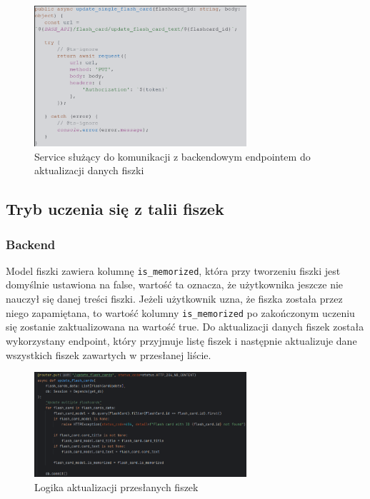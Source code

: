 \begin{figure}[H]
    \centering
    \includegraphics[width=0.7\textwidth]{chapters/chapter_8/screens/update_flash_card_text_web}
    \caption{Service służący do komunikacji z backendowym endpointem do aktualizacji danych fiszki}
    \label{img:update_flash_card_web}
\end{figure}

\subsection{Tryb uczenia się z talii fiszek}

\subsubsection{Backend}

Model fiszki zawiera kolumnę \texttt{is_memorized}, która przy tworzeniu fiszki jest domyślnie ustawiona na false, wartość ta oznacza, że użytkownika jeszcze nie nauczył się danej treści fiszki. Jeżeli użytkownik uzna, że fiszka została przez niego zapamiętana, to wartość kolumny \texttt{is_memorized} po zakończonym uczeniu się zostanie zaktualizowana na wartość true. Do aktualizacji danych fiszek została wykorzystany endpoint, który przyjmuje listę fiszek i następnie aktualizuje dane wszystkich fiszek zawartych w przesłanej liście.

\begin{figure}[H]
    \centering
    \includegraphics[width=0.7\textwidth]{chapters/chapter_8/screens/update_flash_card_memorized_backend}
    \caption{Logika aktualizacji przesłanych fiszek}
    \label{img:update_flash_card_memorized_backend}
\end{figure}

